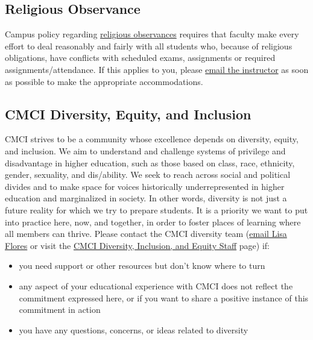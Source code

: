 \documentclass[11pt]{memoir}
\begin{document}
\subsection{Religious Observance}
Campus policy regarding \href{http://www.colorado.edu/policies/observance-religious-holidays-and-absences-classes-andor-exams}{religious observances} requires that faculty make every effort to deal reasonably and fairly with all students who, because of religious obligations, have conflicts with scheduled exams, assignments or required assignments/attendance. If this applies to you, please \href{mailto:brian.keegan@colorado.edu}{email the instructor} as soon as possible to make the appropriate accommodations.

\subsection{CMCI Diversity, Equity, and Inclusion}
CMCI strives to be a community whose excellence depends on diversity, equity, and inclusion. We aim to understand and challenge systems of privilege and disadvantage in higher education, such as those based on class, race, ethnicity, gender, sexuality, and dis/ability. We seek to reach across social and political divides and to make space for voices historically underrepresented in higher education and marginalized in society. In other words, diversity is not just a future reality for which we try to prepare students. It is a priority we want to put into practice here, now, and together, in order to foster places of learning where all members can thrive. Please contact the CMCI diversity team (\href{mailto:lisa.flores@colorado.edu}{email Lisa Flores} or visit the \href{https://www.colorado.edu/cmci/about-college/diversity-equity-and-inclusion/our-team}{CMCI Diversity, Inclusion, and Equity Staff} page) if:
\begin{itemize}
    \item you need support or other resources but don't know where to turn
    \item any aspect of your educational experience with CMCI does not reflect the commitment expressed here, or if you want to share a positive instance of this commitment in action
    \item you have any questions, concerns, or ideas related to diversity
\end{itemize}
\end{document}
